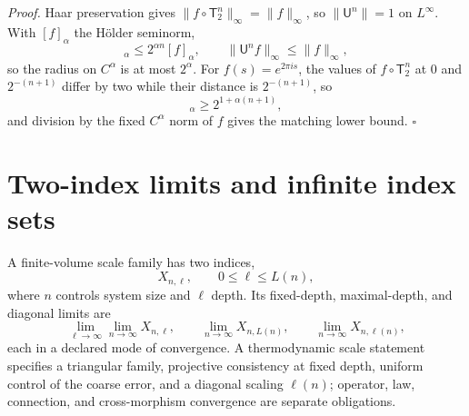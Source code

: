 \noindent\emph{Proof.}
Haar preservation gives
\(\lVert f\circ\mathsf T_2^n\rVert_\infty=\lVert f\rVert_\infty\), so
\(\lVert\mathsf U^n\rVert=1\) on \(L^\infty\). With \([f]_\alpha\) the H\"older seminorm,
\begin{equation}
[f\circ\mathsf T_2^n]_\alpha\leq2^{\alpha n}[f]_\alpha,
\qquad
\lVert\mathsf U^nf\rVert_\infty\leq\lVert f\rVert_\infty,
\label{eq:rg-circle-holder-upper-bound}
\end{equation}
so the radius on \(C^\alpha\) is at most \(2^\alpha\). For
\(f(s)=e^{2\pi is}\), the values of \(f\circ\mathsf T_2^n\) at \(0\) and
\(2^{-(n+1)}\) differ by two while their distance is \(2^{-(n+1)}\), so
\begin{equation}
[f\circ\mathsf T_2^n]_\alpha\geq2^{1+\alpha(n+1)},
\label{eq:rg-circle-holder-lower-bound}
\end{equation}
and division by the fixed \(C^\alpha\) norm of \(f\) gives the matching lower
bound. \(\square\)

\section{Two-index limits and infinite index sets}
\label{sec:rg-two-index-limits}

A finite-volume scale family has two indices,
\begin{equation}
X_{n,\ell},\qquad 0\leq\ell\leq L(n),
\label{eq:rg-two-index-family}
\end{equation}
where \(n\) controls system size and \(\ell\) depth. Its fixed-depth,
maximal-depth, and diagonal limits are
\begin{equation}
\lim_{\ell\to\infty}\lim_{n\to\infty}X_{n,\ell},
\qquad
\lim_{n\to\infty}X_{n,L(n)},
\qquad
\lim_{n\to\infty}X_{n,\ell(n)},
\label{eq:rg-two-index-limits}
\end{equation}
each in a declared mode of convergence. A thermodynamic scale statement
specifies a triangular family, projective consistency at fixed depth, uniform
control of the coarse error, and a diagonal scaling \(\ell(n)\); operator, law,
connection, and cross-morphism convergence are separate obligations.

